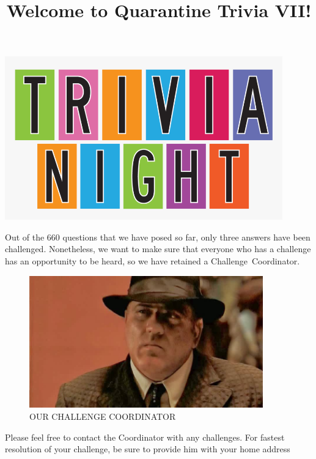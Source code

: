 \documentclass[11pt]{beamer}
\begin{document}
\title{Welcome to Quarantine Trivia VII!\vspace{-0.5in}}
\date{}

\begin{frame}
\titlepage{}
\begin{center}
\includegraphics[max width=0.9\textwidth,
    max height=0.4\textheight]{Images/triviatitleframelogo.png}
\end{center}
\end{frame}

\begingroup{}
\begin{frame}[t]{}
Out of the 660 questions that we have posed so far, only three answers have been
 challenged. Nonetheless, we want to make sure that everyone who has a challenge has an
 opportunity to be heard, so we have retained a \mbox{Challenge Coordinator}.

\pause{}
\begin{center}
\begin{figure}[h]
\caption*{OUR CHALLENGE COORDINATOR}
\includegraphics[max width=0.9\textwidth,
     max height=0.35\textheight]{Images/challengecoordinator.jpg}
\end{figure}
\end{center}
Please feel free to contact the Coordinator with any challenges.
For fastest resolution of your challenge, be sure to provide him with your home address
\end{frame}
\endgroup{}
\end{document}
